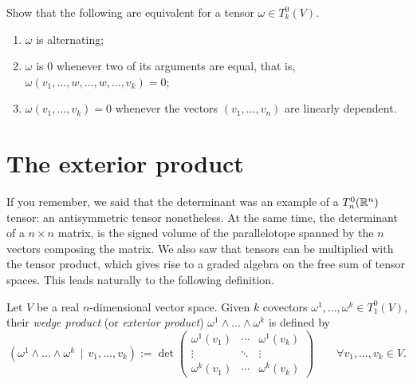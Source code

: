 \begin{exercise}\label{ex:propAlt}
  Show that the following are equivalent for a tensor $\omega\in T_k^0(V)$.
  \begin{enumerate}
    \item $\omega$ is alternating;
    \item $\omega$ is $0$ whenever two of its arguments are equal, that is, ${\omega(v_1, \ldots, w, \ldots, w, \ldots, v_k) = 0}$;
    \item $\omega(v_1, \ldots, v_k) = 0$ whenever the vectors $(v_1, \ldots, v_n)$ are linearly dependent.
  \end{enumerate}
\end{exercise}

\section{The exterior product}

If you remember, we said that the determinant was an example of a $T_n^0(\mathbb{R}^n)$ tensor: an antisymmetric tensor nonetheless.
At the same time, the determinant of a $n\times n$ matrix, is the signed volume of the parallelotope spanned by the $n$ vectors composing the matrix.
We also saw that tensors can be multiplied with the tensor product, which gives rise to a graded algebra on the free sum of tensor spaces.
This leads naturally to the following definition.

\begin{definition}
  Let $V$ be a real $n$-dimensional vector space.
  Given $k$ covectors $\omega^1, \ldots, \omega^k\in T_1^0(V)$, their \emph{wedge product} (or \emph{exterior product}) $\omega^1\wedge\ldots\wedge\omega^k$ is defined by
  \begin{equation}
    \left(
    \omega^1\wedge\ldots\wedge\omega^k\,\mid\, v_1,\ldots,v_k
    \right) := \det\begin{pmatrix}
      \omega^1(v_1) & \cdots & \omega^1(v_k) \\
      \vdots        & \ddots & \vdots        \\
      \omega^k(v_1) & \cdots & \omega^k(v_k)
    \end{pmatrix} \qquad
    \forall v_1,\ldots,v_k\in V.
  \end{equation}
\end{definition}

